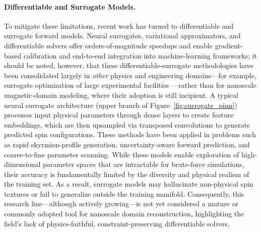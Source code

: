 \documentclass[letterpaper, 12, one column]{article}
\begin{document}
\paragraph{Differentiable and Surrogate Models.}
To mitigate these limitations, recent work has turned to differentiable and surrogate forward models. Neural surrogates, variational approximators, and differentiable solvers offer orders-of-magnitude speedups and enable gradient-based calibration and end-to-end integration into machine-learning frameworks; it should be noted, however, that these differentiable-surrogate methodologies have been consolidated largely in \emph{other} physics and engineering domains---for example, surrogate optimization of large experimental facilities \cite{GallardoRomero2025Differentiable}---rather than for nanoscale magnetic-domain modeling, where their adoption is still incipient. A typical neural surrogate architecture (upper branch of Figure~\ref{fig:surrogate_pinn}) processes input physical parameters through dense layers to create feature embeddings, which are then upsampled via transposed convolutions to generate predicted spin configurations. These methods have been applied in problems such as rapid skyrmion-profile generation, uncertainty-aware forward prediction, and coarse-to-fine parameter scanning. While these models enable exploration of high-dimensional parameter spaces that are intractable for brute-force simulations, their accuracy is fundamentally limited by the diversity and physical realism of the training set. As a result, surrogate models may hallucinate non-physical spin textures or fail to generalize outside the training manifold. Consequently, this research line—although actively growing—is not yet considered a mature or commonly adopted tool for nanoscale domain reconstruction, highlighting the field's lack of physics-faithful, constraint-preserving differentiable solvers.
\end{document}
